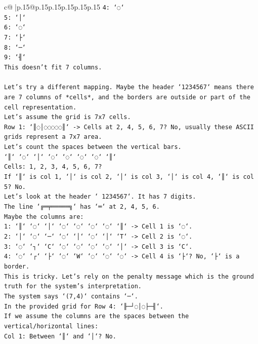 \documentclass{article}
\begin{document}
{\begin{supertabular}{c@{$\;$}|p{.15\linewidth}@{}p{.15\linewidth}p{.15\linewidth}p{.15\linewidth}p{.15\linewidth}p{.15\linewidth}}
{{{\texttt{4: `◌`} \\
\texttt{5: `│`} \\
\texttt{6: `◌`} \\
\texttt{7: `├`} \\
\texttt{8: `─`} \\
\texttt{9: `╢`} \\
\texttt{This doesn't fit 7 columns.} \\
\\ 
\texttt{Let's try a different mapping. Maybe the header `1234567` means there are 7 columns of *cells*, and the borders are outside or part of the cell representation.} \\
\texttt{Let's assume the grid is 7x7 cells.} \\
\texttt{Row 1: `║◌│◌◌◌◌◌║` {-}> Cells at 2, 4, 5, 6, 7? No, usually these ASCII grids represent a 7x7 area.} \\
\texttt{Let's count the spaces between the vertical bars.} \\
\texttt{`║` `◌` `│` `◌` `◌` `◌` `◌` `║`} \\
\texttt{Cells: 1, 2, 3, 4, 5, 6, 7?} \\
\texttt{If `║` is col 1, `│` is col 2, `│` is col 3, `│` is col 4, `║` is col 5? No.} \\
\texttt{Let's look at the header ` 1234567`. It has 7 digits.} \\
\texttt{The line `╔═╤═════╗` has `═` at 2, 4, 5, 6.} \\
\texttt{Maybe the columns are:} \\
\texttt{1: `║` `◌` `│` `◌` `◌` `◌` `◌` `║` {-}> Cell 1 is `◌`.} \\
\texttt{2: `│` `◌` `─` `◌` `│` `◌` `│` `T` {-}> Cell 2 is `◌`.} \\
\texttt{3: `◌` `┐` `C` `◌` `◌` `◌` `◌` `│` {-}> Cell 3 is `C`.} \\
\texttt{4: `◌` `┌` `├` `◌` `W` `◌` `◌` `◌` {-}> Cell 4 is `├`? No, `├` is a border.} \\
\texttt{This is tricky. Let's rely on the penalty message which is the ground truth for the system's interpretation.} \\
\texttt{The system says `(7,4)` contains `─`.} \\
\texttt{In the provided grid for Row 4: `╟─┘◌│◌├─╢`.} \\
\texttt{If we assume the columns are the spaces between the vertical/horizontal lines:} \\
\texttt{Col 1: Between `║` and `│`? No.} \\
}}}
\end{supertabular}}
\end{document}

